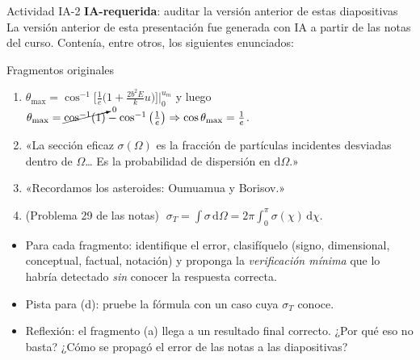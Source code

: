 \documentclass[aspectratio=169]{beamer}
\newcommand{\tmax}{\theta_{\max}}
\newcommand{\um}{u_{m}}
\newcommand{\dd}{\mathrm{d}}
\newcommand{\IArequerida}{\colorbox{green!20}{\scriptsize\textbf{IA-requerida}}}
\begin{document}
\begin{frame}{Actividad IA-2 \IArequerida: auditar la versión anterior de estas diapositivas}
\footnotesize
La versión anterior de esta presentación fue generada con IA a partir de las notas del curso.
Contenía, entre otros, los siguientes enunciados:
\begin{exampleblock}{Fragmentos originales}
\begin{enumerate}
  \item[(a)] $\tmax=\cos^{-1}\!\Big[\frac1e\big(1+\frac{2b^{2}E}{k}u\big)\Big]\Big|_0^{\um}$
        \; y luego \;
        $\tmax=\cancelto{0}{\cos^{-1}(1)}-\cos^{-1}\big(\frac1e\big)\Rightarrow\cos\tmax=\frac1e$.
  \item[(b)] «La sección eficaz $\sigma(\Omega)$ es la fracción de partículas incidentes
        desviadas dentro de $\Omega$… Es la probabilidad de dispersión en $\dd\Omega$.»
  \item[(c)] «Recordamos los asteroides: Oumuamua y Borisov.»
  \item[(d)] (Problema 29 de las notas) $\;\sigma_T=\int\sigma\,\dd\Omega
        =2\pi\int_0^{\pi}\sigma(\chi)\,\dd\chi$.
\end{enumerate}
\end{exampleblock}
\begin{itemize}
  \item<2-> Para cada fragmento: identifique el error, clasifíquelo (signo, dimensional,
        conceptual, factual, notación) y proponga la \emph{verificación mínima} que lo
        habría detectado \emph{sin} conocer la respuesta correcta.
  \item<3-> Pista para (d): pruebe la fórmula con un caso cuya $\sigma_T$ conoce.
  \item<4-> Reflexión: el fragmento (a) llega a un resultado final correcto.
        ¿Por qué eso no basta? ¿Cómo se propagó el error de las notas a las diapositivas?
\end{itemize}
\end{frame}
\end{document}
